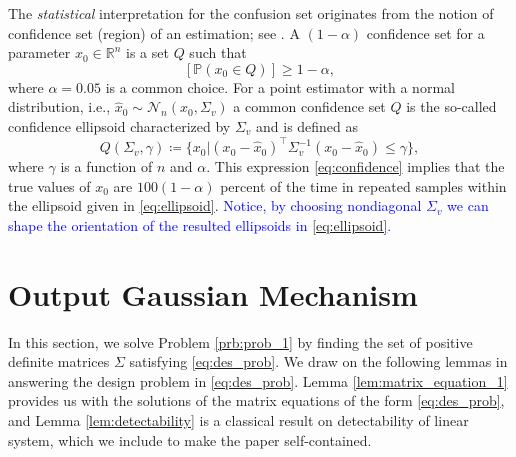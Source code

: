 \documentclass{ifacconf}
\newcommand{\calN}{\ensuremath{\mathcal{N}}}
\newcommand{\R}{\ensuremath{\mathbb R}}
\def\be{\begin{equation}}
\def\ee{\end{equation}}
\newcommand{\+}{\mathsmaller{+}}
\newcommand{\blue}[1]{\textcolor{blue}{#1}}
\begin{document}
\par The \textit{statistical} interpretation for the confusion set originates from the notion of confidence set (region) of an estimation; see \cite{adkins1990improved}.
 A $(1- \alpha)$ confidence set for a parameter ${x_{0}} \in \R^n$ is a set $Q$ such that 
\be\label{eq:confidence}
[\mathbb{P}({x_{0}} \in Q)]\geq 1 - \alpha,
\ee 
where $\alpha = 0.05$ is a common choice.
For a point estimator with a normal distribution, i.e., $\hat{x}_0 \sim \calN_{n}({x_{0}}, \Sigma_v)$ a common confidence set $Q$ is the so-called confidence ellipsoid characterized by $\Sigma_v$ and is defined as
\be\label{eq:ellipsoid}
Q({\Sigma_v}, \gamma) \coloneqq
\{{x_{0}}|
({x_{0}} - \hat{x}_0)^\top \Sigma_v^{-1} ({x_{0}} - \hat{x}_0) \leq \gamma
\},
\ee
where $\gamma$ is a function of $n$ and $\alpha$.
This expression \eqref{eq:confidence} implies that the true values of ${x_{0}}$
are $100(1-\alpha)$ percent of the time in repeated samples within the ellipsoid given in \eqref{eq:ellipsoid}. \blue{ Notice, by choosing nondiagonal $\Sigma_v$ we can shape the orientation of the resulted ellipsoids in \eqref{eq:ellipsoid}.}
\section{Output Gaussian Mechanism}\label{sec:out_put_des}
In this section, we solve Problem \ref{prb:prob_1} by finding the set of positive definite matrices $\Sigma$ satisfying \eqref{eq:des_prob}. 
We draw on the following lemmas in answering the design problem in \eqref{eq:des_prob}. Lemma \ref{lem:matrix_equation_1} provides us with the solutions of the matrix equations of the form \eqref{eq:des_prob}, and Lemma \ref{lem:detectability} is a classical result on detectability of linear system, which we include to make the paper self-contained.
\end{document}
